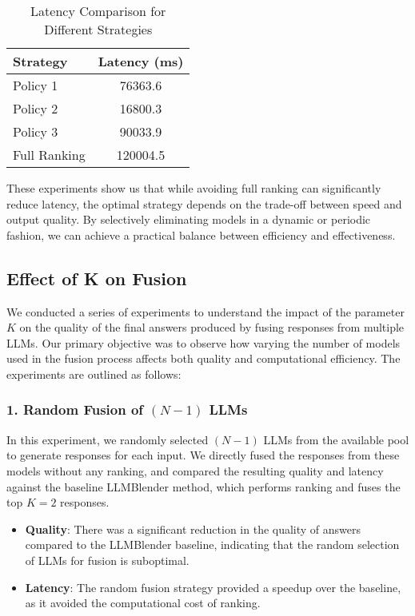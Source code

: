 \documentclass[sigconf,authordraft]{acmart}
\begin{document}
\begin{table}
    \centering
    \caption{Latency Comparison for Different Strategies}
    \label{tab:latency_comparison}
    \begin{tabular}{@{}lc@{}}
        \toprule
        \textbf{Strategy}               & \textbf{Latency (ms)} \\ \midrule
        Policy 1                        & 76363.6                \\
        Policy 2                        & 16800.3                \\
        Policy 3                        & 90033.9                 \\
        Full Ranking                    & 120004.5               \\ \bottomrule
    \end{tabular}
\end{table}

These experiments show us that while avoiding full ranking can significantly reduce latency, the optimal strategy depends on the trade-off between speed and output quality. By selectively eliminating models in a dynamic or periodic fashion, we can achieve a practical balance between efficiency and effectiveness.

\subsection{Effect of K on Fusion}

We conducted a series of experiments to understand the impact of the parameter \( K \) on the quality of the final answers produced by fusing responses from multiple LLMs. Our primary objective was to observe how varying the number of models used in the fusion process affects both quality and computational efficiency. The experiments are outlined as follows:

\subsubsection{1. Random Fusion of \( ( N-1 ) \) LLMs}
In this experiment, we randomly selected \( ( N-1 ) \) LLMs from the available pool to generate responses for each input. We directly fused the responses from these models without any ranking, and compared the resulting quality and latency against the baseline LLMBlender method, which performs ranking and fuses the top \( K=2 \) responses. 

\begin{itemize}
    \item \textbf{Quality}: There was a significant reduction in the quality of answers compared to the LLMBlender baseline, indicating that the random selection of LLMs for fusion is suboptimal.
    \item \textbf{Latency}: The random fusion strategy provided a speedup over the baseline, as it avoided the computational cost of ranking.
\end{itemize}
\end{document}
